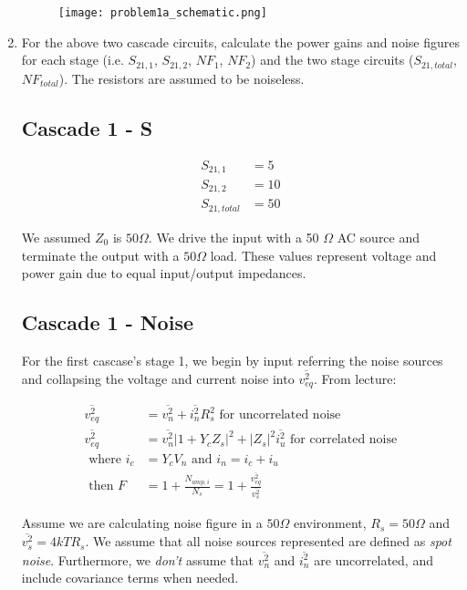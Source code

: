 \begin{enumerate}[label=(\alph*)]
    \begin{figure}[H]
        \centering \texttt{[image: problem1a\_schematic.png]}
    \end{figure}

    \item {\color{blue}For the above two cascade circuits, calculate the power gains and noise figures for each stage (i.e. $S_{21,1}$, $S_{21,2}$, $NF_1$, $NF_2$) and the two stage circuits ($S_{21,total}$, $NF_{total}$).
    The resistors are assumed to be noiseless.}

    \subsection{Cascade 1 - S}
    \begin{align*}
        S_{21,1} &= 5 \\
        S_{21,2} &= 10 \\
        S_{21,total} &= 50
    \end{align*}

    We assumed $Z_0$ is $50 \Omega$. We drive the input with a 50 $\Omega$ AC source and terminate the output with a $50 \Omega$ load.
    These values represent voltage and power gain due to equal input/output impedances.

    \subsection{Cascade 1 - Noise}

    For the first cascase's stage 1, we begin by input referring the noise sources and collapsing the voltage and current noise into $\overline{v_{eq}^2}$.
    From lecture:

    \begin{align*}
        \overline{v_{eq}^2} &= \overline{v_n^2} + \overline{i_n^2} R_s^2 \text{ for uncorrelated noise} \\
        \overline{v_{eq}^2} &= \overline{v_n^2} |1 + Y_c Z_s|^2 + |Z_s|^2 \overline{i_u^2} \text{ for correlated noise} \\
        \text{ where } i_c &= Y_c V_n \text{ and } i_n = i_c + i_u \\
        \text{ then } F &= 1 + \frac{N_{amp,i}}{N_s} = 1 + \frac{\overline{v_{eq}^2}}{\overline{v_s^2}}
    \end{align*}

    Assume we are calculating noise figure in a $50 \Omega$ environment, $R_s = 50 \Omega$ and $\overline{v_s^2} = 4 kT R_s$.
    We assume that all noise sources represented are defined as \emph{spot noise}.
    Furthermore, we \emph{don't} assume that $\overline{v_n^2}$ and $\overline{i_n^2}$ are uncorrelated, and include covariance terms when needed.


\end{enumerate}
